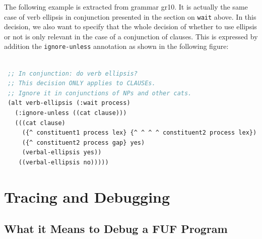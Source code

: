\documentclass[10pt,a4paper]{report}
\begin{document}
The following example is extracted from grammar gr10.  It is actually the
same case of verb ellipsis in conjunction presented in the section on
{\tt wait} above.  In this decision, we also want to specify that the whole
decision of whether to use ellipsis or not is only relevant in the case of
a conjunction of clauses.  This is expressed by addition the
{\tt ignore-unless} annotation as shown in the following figure:

\begin{lstlisting}[language=Lisp]

 ;; In conjunction: do verb ellipsis?
 ;; This decision ONLY applies to CLAUSEs.
 ;; Ignore it in conjunctions of NPs and other cats.
 (alt verb-ellipsis (:wait process)
   (:ignore-unless ((cat clause)))
   (((cat clause)
     ({^ constituent1 process lex} {^ ^ ^ ^ constituent2 process lex})
     ({^ constituent2 process gap} yes)
     (verbal-ellipsis yes))
    ((verbal-ellipsis no)))))

\end{lstlisting}


\chapter{Tracing and Debugging}

\section{What it Means to Debug a FUF Program}
\end{document}
